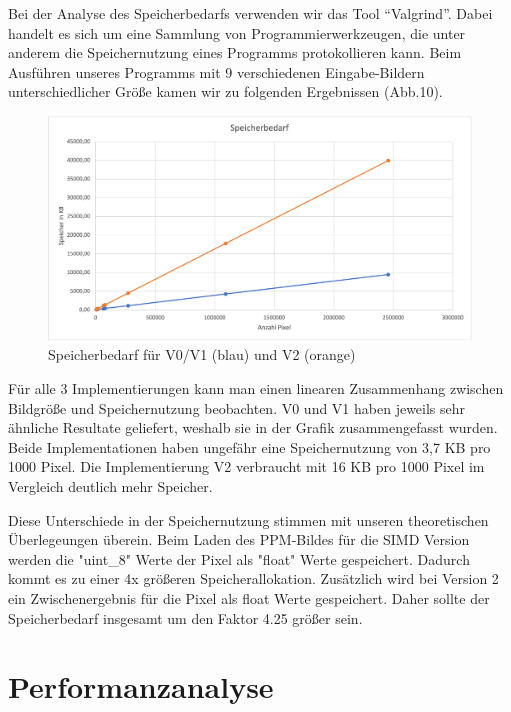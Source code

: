 \documentclass[course=erap]{aspdoc}
\begin{document}
\par
Bei der Analyse des Speicherbedarfs verwenden wir das Tool “Valgrind”. Dabei handelt es sich um eine Sammlung von Programmierwerkzeugen, die unter anderem die Speichernutzung eines Programms protokollieren kann. Beim Ausführen unseres Programms mit 9 verschiedenen Eingabe-Bildern unterschiedlicher Größe kamen wir zu folgenden Ergebnissen (Abb.10).

\begin{figure}[h]
\centering
\includegraphics[width=1\textwidth]{Bilder/Speicherbedarf2.png}
\caption{Speicherbedarf für V0/V1 (blau) und V2 (orange)}
\end{figure}

\par
Für alle 3 Implementierungen kann man einen linearen Zusammenhang zwischen Bildgröße und Speichernutzung beobachten. V0 und V1 haben jeweils sehr ähnliche Resultate geliefert, weshalb sie in der Grafik zusammengefasst wurden. Beide Implementationen haben ungefähr eine Speichernutzung von 3,7 KB pro 1000 Pixel. Die Implementierung V2 verbraucht mit 16 KB pro 1000 Pixel im Vergleich deutlich mehr Speicher.

\par
Diese Unterschiede in der Speichernutzung stimmen mit unseren theoretischen Überlegeungen überein. Beim Laden des PPM-Bildes für die SIMD Version werden die "uint\_8" Werte der Pixel als "float" Werte gespeichert. Dadurch kommt es zu einer 4x größeren Speicherallokation. Zusätzlich wird bei Version 2 ein Zwischenergebnis für die Pixel als float Werte gespeichert. Daher sollte der Speicherbedarf insgesamt um den Faktor 4.25 größer sein. 


\section{Performanzanalyse}
\end{document}

